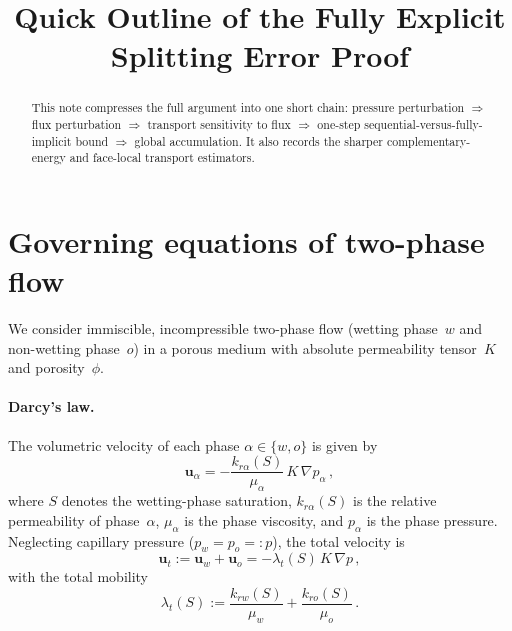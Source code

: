 \documentclass[11pt]{article}
\title{Quick Outline of the Fully Explicit Splitting Error Proof}
\date{}
\begin{document}
\maketitle

\begin{abstract}
This note compresses the full argument into one short chain: pressure perturbation $\Rightarrow$ flux
perturbation $\Rightarrow$ transport sensitivity to flux $\Rightarrow$ one-step sequential-versus-fully-implicit bound $\Rightarrow$
global accumulation.  It also records the sharper complementary-energy and face-local transport
estimators.
\end{abstract}

\section{Governing equations of two-phase flow}\label{sec:governing}

We consider immiscible, incompressible two-phase flow (wetting phase~$w$ and
non-wetting phase~$o$) in a porous medium with absolute permeability
tensor~$K$ and porosity~$\phi$.

\paragraph{Darcy's law.}
The volumetric velocity of each phase $\alpha\in\{w,o\}$ is given by
\begin{equation}\label{eq:darcy}
  \mathbf{u}_\alpha
    = -\frac{k_{r\alpha}(S)}{\mu_\alpha}\,K\,\nabla p_\alpha\,,
\end{equation}
where $S$ denotes the wetting-phase saturation, $k_{r\alpha}(S)$ is the
relative permeability of phase~$\alpha$, $\mu_\alpha$ is the phase
viscosity, and $p_\alpha$ is the phase pressure.  Neglecting capillary
pressure ($p_w = p_o =: p$), the total velocity is
\begin{equation}\label{eq:utot}
  \mathbf{u}_t
    := \mathbf{u}_w + \mathbf{u}_o
    = -\lambda_t(S)\,K\,\nabla p\,,
\end{equation}
with the total mobility
\begin{equation}\label{eq:total-mobility}
  \lambda_t(S)
    := \frac{k_{rw}(S)}{\mu_w} + \frac{k_{ro}(S)}{\mu_o}\,.
\end{equation}
\end{document}

